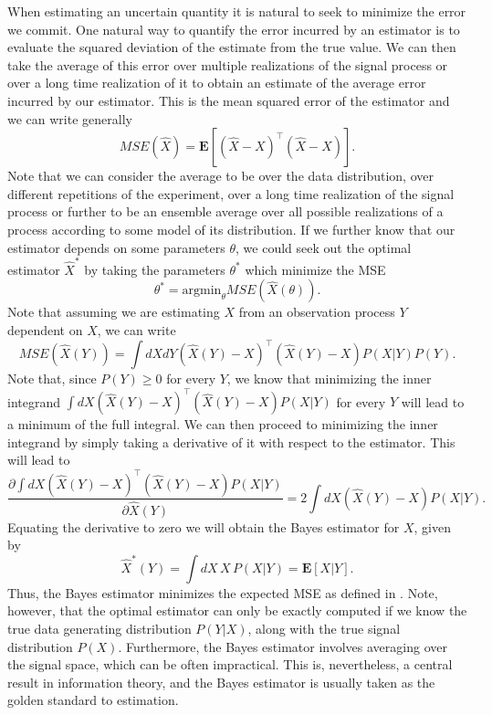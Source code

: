 
When estimating an uncertain quantity it is natural to seek to minimize the error we commit. One natural way to quantify the error incurred by an estimator is to evaluate the squared deviation of the estimate from the true value. We can then take the average of this error over multiple realizations of the signal process or over a long time realization of it to obtain an estimate of the average error incurred by our estimator. This is the mean squared error of the estimator and we can write generally
\[
MSE(\hat{X}) = \boldsymbol{E}\left[ (\hat{X} - X)^\top (\hat{X}-X)\right].
\]
Note that we can consider the average to be over the data distribution, over different repetitions of the experiment, over a long time realization of the signal process or further to be an ensemble average over all possible realizations of a process according to some model of its distribution. If we further know that our estimator depends on some parameters $\theta$, we could seek out the optimal estimator $\hat{X}^*$ by taking the parameters $\theta^*$ which minimize the MSE
\[
\theta^* = \textrm{argmin}_\theta MSE( \hat{X}(\theta)  ).
\]
Note that assuming we are estimating $X$ from an observation process $Y$ dependent on $X$, we can write
\begin{equation}
\label{eq:bayes_mse}
MSE( \hat{X}(Y) ) = \int dX dY  (\hat{X}(Y) - X)^\top (\hat{X}(Y)-X) P(X|Y)P(Y).
\end{equation}
Note that, since $P(Y)\ge 0$ for every $Y$, we know that minimizing the inner integrand $\int dX (\hat{X}(Y) - X)^\top (\hat{X}(Y)-X) P(X|Y)$ for every $Y$ will lead to a minimum of the full integral. We can then proceed to minimizing the inner integrand by simply taking a derivative of it with respect to the estimator. This will lead to
\[
\frac{\partial \int dX (\hat{X}(Y) - X)^\top (\hat{X}(Y)-X) P(X|Y)}{\partial \hat{X}(Y)} = 2 \int dX (\hat{X}(Y) - X) P(X|Y).
\]
Equating the derivative to zero we will obtain the Bayes estimator for $X$, given by
\[
\hat{X}^*(Y) = \int dX\, X\, P(X|Y) = \boldsymbol{E}[X|Y].
\]
Thus, the Bayes estimator minimizes the expected MSE as defined in . Note, however, that the optimal estimator can only be exactly computed if we know the true data generating distribution $P(Y|X)$, along with the true signal distribution $P(X)$. Furthermore, the Bayes estimator involves averaging over the signal space, which can be often impractical. This is, nevertheless, a central result in information theory, and the Bayes estimator is usually taken as the golden standard to estimation.\par
